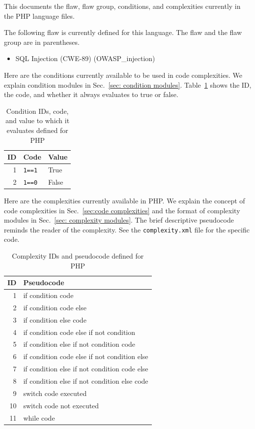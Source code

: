 \begin{appendices}
This documents the flaw, flaw group, conditions, and complexities currently in the
PHP language files.

The following flaw is currently defined for this language.
The flaw and the flaw group are in
parentheses.
\begin{itemize}
    \item SQL Injection (CWE-89) (OWASP\_injection)
\end{itemize}

Here are the conditions currently available to be used in code complexities.
We explain condition modules in Sec.~\ref{sec: condition modules}.
Table~\ref{tab:condition IDs for PHP} shows the ID, the code, and whether it
always evaluates to true or false.

\begin{table}[H]
\centering
\caption{Condition IDs, code, and value to which it evaluates defined for
  PHP}
\begin{tabular}{|r|l|l|}
\hline
\textbf{ID} & \textbf{Code} & \textbf{Value} \\
\hline
1 & \verb|1==1| & True \\
\hline
2 & \verb|1==0| & False \\
\hline
\end{tabular}
\label{tab:condition IDs for PHP}
\end{table}

\newpage

Here are the complexities currently available in PHP.
We explain the concept of code complexities in Sec.~\ref{sec:code complexities} and
the format of complexity modules in Sec.~\ref{sec: complexity modules}.
The brief descriptive pseudocode reminds the reader of the complexity.
See the \verb|complexity.xml| file for the specific code.

\begin{table}[H]
\centering
\caption{Complexity IDs and pseudocode defined for PHP}
\begin{tabular}{|r|l|}
\hline
\textbf{ID} & \textbf{Pseudocode} \\
\hline
 1 & if condition code \\
\hline
 2 & if condition code else \\
\hline
 3 & if condition else code \\
\hline
 4 & if condition code else if not condition \\
\hline
 5 & if condition else if not condition code \\
\hline
 6 & if condition code else if not condition else \\
\hline
 7 & if condition else if not condition code else \\
 \hline
 8 & if condition else if not condition else code \\
\hline
 9 & switch code executed \\
\hline
10 & switch code not executed \\
\hline
11 & while code \\
\hline


\end{tabular}
\end{table}
\end{appendices}
